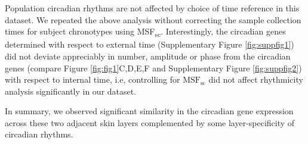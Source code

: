 Population circadian rhythms are not affected by choice of time reference in this dataset. We repeated the above analysis without correcting the sample collection times for subject chronotypes using MSF\textsubscript{sc}. Interestingly, the circadian genes determined with respect to external time (Supplementary Figure \ref{fig:suppfig1}) did not deviate appreciably in number, amplitude or phase from the circadian genes (compare Figure \ref{fig:fig1}C,D,E,F and Supplementary Figure \ref{fig:suppfig2}) with respect to internal time, i.e, controlling for $\textrm{MSF}_\textrm{sc}$ did not affect rhythmicity analysis significantly in our dataset.

In summary, we observed significant similarity in the circadian gene expression across these two adjacent skin layers complemented by some layer-specificity of circadian rhythms. 



